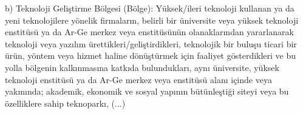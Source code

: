 b) Teknoloji Geliştirme Bölgesi (Bölge): Yüksek/ileri teknoloji kullanan ya da yeni teknolojilere yönelik firmaların, belirli bir üniversite veya yüksek teknoloji enstitüsü ya da Ar-Ge merkez veya enstitüsünün olanaklarından yararlanarak teknoloji veya yazılım ürettikleri/geliştirdikleri, teknolojik bir buluşu ticari bir ürün, yöntem veya hizmet haline dönüştürmek için faaliyet gösterdikleri ve bu yolla bölgenin kalkınmasına katkıda bulundukları, aynı üniversite, yüksek teknoloji enstitüsü ya da Ar-Ge merkez veya enstitüsü alanı içinde veya yakınında; akademik, ekonomik ve sosyal yapının bütünleştiği siteyi veya bu özelliklere sahip teknoparkı, (...)\textsuperscript{\cite{kanun7263}}

\begin{comment}
Tasarım kısmında, çalışmada yapılan hesaplamalar ilgili teori ve
teoremlere dayandırılarak açıklanmak zorundadır. Yapılacak projenin
teorik altyapısına da bağlı olarak gerekli hesaplamalar ve varsa
çizimler yapılmalıdır. Hesaplamalarda kullanılan sayısal değerler
çizelgeler halinde verilmeli, hesaplama sonuçları da ya çizelge ya da
şekillerle gösterilmelidir. Tasarım çizimlerinde çizim kağıdında başlık
(antet) bulunmalı, çizimin ne zaman, kim ve kimler tarafından, kimin
danışmanlığında, hangi proje kapsamında yapıldığı bilgileri yer
almalıdır. Tasarım çizimlerinda tüm boyutlandırma ölçülerinin sayısal
olarak verilmesi zorunludur. Tasarım bölümünün sonunda yapılacak
çalışmanın tüm detayları ortaya konmalı kullanılacak ve satın alınacak
malzeme listesi çıkarılarak listelenmeli ve \textbf{ön maliyet
hesabı yapılmalıdır.} Ayrıca projenin gerçekleştirilmesi ve sonrasında
kullanılırken oluşturabileceği hukuksal sorunlar araştırılmalı ve
yazılmalıdır.

Tasarımla ilgili bölümler aşağıdaki alt başlıklara sahip olabilir.

---
config:
  layout: fixed
  fontSize: 22px
---
flowchart LR
    A["Harici Batarya"] --> B["Mikrodenetleyici"]
    C["LDR Sensörleri"] --> B
    B --> D["Bluetooth Modülü"]
    D -.-> F["Bilgisayar"]

---
config:
  layout: fixed
  fontSize: 22px
---
flowchart LR
    A["Mikrodenetleyici, LDR verilerini SAR ADC ile dijitale çevirip Bluetooth ile bilgisayara iletir."] --> B["Python kodu, dijital LDR verilerini voltaja dönüştürür, EMA filtresi ve geri yönlü sonlu fark yöntemiyle işleyerek, önünden geçen kişiye ait verileri CSV dosyasına kaydeder."]
    B --> C["Matlab kodu CSV dosyasındaki verileri okuyup veriden özellikleri çıkarır, yapay zeka modelini belirler ve yapay zekayı eğitir."]
    A@{ shape: rect}


\end{comment}
